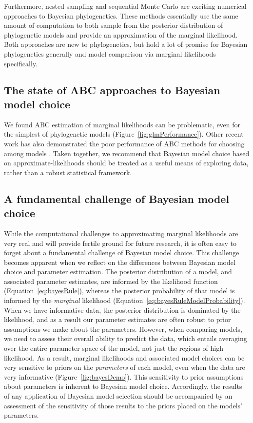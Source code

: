 Furthermore, nested sampling and sequential Monte Carlo are exciting numerical
approaches to Bayesian phylogenetics.
These methods essentially use the same amount of computation to both sample
from the posterior distribution of phylogenetic models and provide an
approximation of the marginal likelihood.
Both approaches are new to phylogenetics, but hold a lot of promise
for Bayesian phylogenetics generally and model comparison via
marginal likelihoods specifically.


\subsection{The state of ABC approaches to Bayesian model choice}

We found ABC estimation of marginal likelihoods can be problematic,
even for the simplest of phylogenetic models
(Figure~\ref{fig:glmPerformance}).
Other recent work has also demonstrated the poor performance of ABC methods for
choosing among models \citep{Robert2011,Oaks2012,Oaks2014reply}.
Taken together, we recommend that Bayesian model choice based on
approximate-likelihoods should be treated as a useful means of exploring data,
rather than a robust statistical framework.


\subsection{A fundamental challenge of Bayesian model choice}

While the computational challenges to approximating marginal likelihoods
are very real and will provide fertile ground for future research,
it is often easy to forget about a fundamental challenge of Bayesian model
choice.
This challenge becomes apparent when we reflect on the differences between
Bayesian model choice and parameter estimation.
The posterior distribution of a model, and associated parameter estimates, are
informed by the likelihood function (Equation~\ref{eq:bayesRule}),
whereas the posterior probability of that model is informed by the
\emph{marginal} likelihood
(Equation~\ref{eq:bayesRuleModelProbability}).
When we have informative data, the posterior distribution is dominated by the
likelihood, and as a result our parameter estimates are often robust to prior
assumptions we make about the parameters.
However, when comparing models, we need to assess their overall ability to
predict the data, which entails averaging over the entire parameter space of
the model, not just the regions of high likelihood.
As a result, marginal likelihoods and associated model choices can be very
sensitive to priors on the \emph{parameters} of each model, even when the data
are very informative (Figure~\ref{fig:bayesDemo}).
This sensitivity to prior assumptions about parameters is inherent to Bayesian
model choice.
Accordingly, the results of any application of Bayesian model selection should
be accompanied by an assessment of the sensitivity of those results to the
priors placed on the models' parameters.


